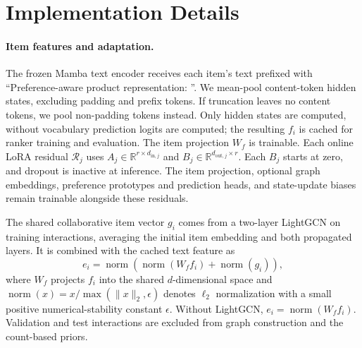 ﻿\documentclass[sigconf,anonymous,review]{acmart}
\newcommand{\norm}[1]{\operatorname{norm}(#1)}
\begin{document}
\section{Implementation Details}
\label{app:implementation}
\paragraph{Item features and adaptation.}
The frozen Mamba text encoder receives each item's text prefixed with ``Preference-aware product representation: ''. We mean-pool content-token hidden states, excluding padding and prefix tokens. If truncation leaves no content tokens, we pool non-padding tokens instead. Only hidden states are computed, without vocabulary prediction logits are computed; the resulting $f_i$ is cached for ranker training and evaluation. The item projection $W_f$ is trainable. Each online LoRA residual $\mathcal R_j$ uses $A_j\in\mathbb R^{r\times d_{\mathrm{in},j}}$ and $B_j\in\mathbb R^{d_{\mathrm{out},j}\times r}$. Each $B_j$ starts at zero, and dropout is inactive at inference. The item projection, optional graph embeddings, preference prototypes and prediction heads, and state-update biases remain trainable alongside these residuals.

The shared collaborative item vector $g_i$ comes from a two-layer LightGCN on training interactions, averaging the initial item embedding and both propagated layers. It is combined with the cached text feature as
\begin{equation}
 e_i=\norm{\norm{W_f f_i}+\norm{g_i}},
\end{equation}
where $W_f$ projects $f_i$ into the shared $d$-dimensional space and $\norm{x}=x/\max(\lVert x\rVert_2,\epsilon)$ denotes $\ell_2$ normalization with a small positive numerical-stability constant $\epsilon$. Without LightGCN, $e_i=\norm{W_f f_i}$. Validation and test interactions are excluded from graph construction and the count-based priors.
\end{document}
